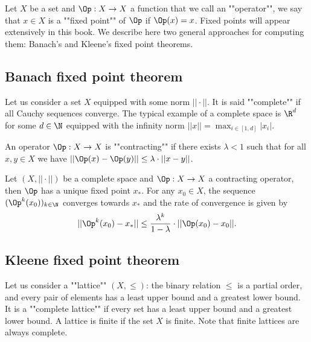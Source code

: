 Let $X$ be a set and $\Op : X \to X$ a function that we call an ""operator"", we say that $x \in X$ is a ""fixed point"" of $\Op$ if $\Op(x) = x$.
Fixed points will appear extensively in this book. 
We describe here two general approaches for computing them: Banach's and Kleene's fixed point theorems.

\subsection*{Banach fixed point theorem}
Let us consider a set $X$ equipped with some norm $||\cdot||$.
It is said ""complete"" if all Cauchy sequences converge.
The typical example of a complete space is $\R^d$ for some $d \in \N$ equipped with the infinity norm $||x|| = \max_{i \in [1,d]} |x_i|$.

An operator $\Op : X \to X$ is ""contracting"" if there exists $\lambda < 1$ such that for all $x,y \in X$ we have
$||\Op(x) - \Op(y)|| \le \lambda \cdot ||x - y||$.

\begin{theorem}
\label{1-thm:banach}
Let $(X,||\cdot||)$ be a complete space and $\Op : X \to X$ a contracting operator, then $\Op$ has a unique fixed point $x_*$.
For any $x_0 \in X$, the sequence $(\Op^k(x_0))_{k \in \N}$ converges towards $x_*$ and the rate of convergence is given by
\[
||\Op^k(x_0) - x_*|| \le \frac{\lambda^k}{1 - \lambda} \cdot ||\Op(x_0) - x_0||.
\]
\end{theorem}

%

\subsection*{Kleene fixed point theorem}
Let us consider a ""lattice"" $(X,\le)$: the binary relation $\le$ is a partial order, and every pair of elements has a least upper bound and a greatest lower bound. It is a ""complete lattice"" if every set has a least upper bound and a greatest lower bound.
A lattice is finite if the set $X$ is finite.
Note that finite lattices are always complete.

